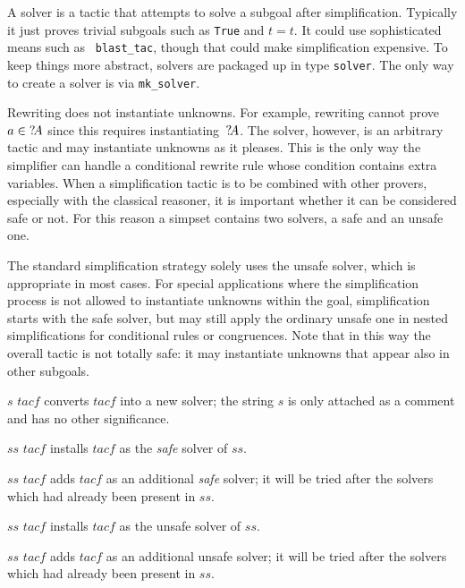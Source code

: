 A solver is a tactic that attempts to solve a subgoal after
simplification.  Typically it just proves trivial subgoals such as
\texttt{True} and $t=t$.  It could use sophisticated means such as {\tt
  blast_tac}, though that could make simplification expensive.
To keep things more abstract, solvers are packaged up in type
\texttt{solver}. The only way to create a solver is via \texttt{mk_solver}.

Rewriting does not instantiate unknowns.  For example, rewriting
cannot prove $a\in {?\!A}$ since this requires
instantiating~${?\!A}$.  The solver, however, is an arbitrary tactic
and may instantiate unknowns as it pleases.  This is the only way the
simplifier can handle a conditional rewrite rule whose condition
contains extra variables.  When a simplification tactic is to be
combined with other provers, especially with the classical reasoner,
it is important whether it can be considered safe or not.  For this
reason a simpset contains two solvers, a safe and an unsafe one.

The standard simplification strategy solely uses the unsafe solver,
which is appropriate in most cases.  For special applications where
the simplification process is not allowed to instantiate unknowns
within the goal, simplification starts with the safe solver, but may
still apply the ordinary unsafe one in nested simplifications for
conditional rules or congruences. Note that in this way the overall
tactic is not totally safe:  it may instantiate unknowns that appear also 
in other subgoals.

\begin{ttdescription}
\item[\ttindexbold{mk_solver} $s$ $tacf$] converts $tacf$ into a new solver;
  the string $s$ is only attached as a comment and has no other significance.

\item[$ss$ \ttindexbold{setSSolver} $tacf$] installs $tacf$ as the
  \emph{safe} solver of $ss$.
  
\item[$ss$ \ttindexbold{addSSolver} $tacf$] adds $tacf$ as an
  additional \emph{safe} solver; it will be tried after the solvers
  which had already been present in $ss$.
  
\item[$ss$ \ttindexbold{setSolver} $tacf$] installs $tacf$ as the
  unsafe solver of $ss$.
  
\item[$ss$ \ttindexbold{addSolver} $tacf$] adds $tacf$ as an
  additional unsafe solver; it will be tried after the solvers which
  had already been present in $ss$.

\end{ttdescription}

